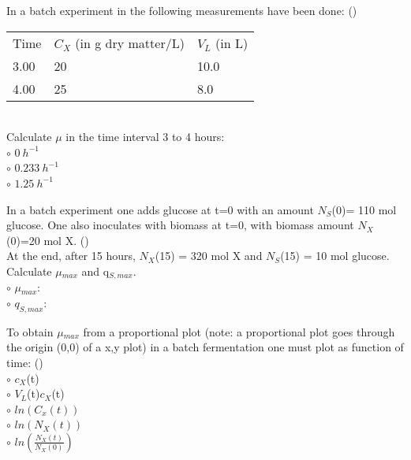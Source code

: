 \documentclass[]{beamer}
\begin{document}
\begin{frame}[shrink] {} 
\color{blue}
  In a batch experiment in the following measurements have been done:
 ({\color{red}{Q8}})\\
\color{gray}
\begin{tabular}[ ]{l l l}
Time & $C_{X}$ (in g dry matter/L) & $V_{L}$ (in L)  \\
3.00 & 20 & 10.0  \\
4.00 & 25 & 8.0  \\
\end{tabular}  \\
\color{blue}
  Calculate $\mu$ in the time interval 3 to 4 hours:
  \\
\color{black}
\setlength{\parindent}{-0.4cm}
{\color{red}$\circ$} $0 ~h^{-1}$  \\
{\color{red}$\circ$} $0.233 ~h^{-1}$  \\
{\color{red}$\circ$} $1.25 ~h^{-1}$  \\
\end{frame}


\begin{frame}[shrink] {} 
\color{blue}
In a batch experiment one adds glucose at t=0 with an amount $N_{S}$(0)= 110 mol glucose. One also inoculates with biomass at t=0, with biomass amount $N_{X}$(0)=20 mol X. ({\color{red}{Q9}})\\
At the end, after 15 hours, $N_{X}$(15) = 320 mol X and $N_{S}$(15) = 10 mol glucose.  \\
Calculate $\mu$$_{max}$ and q$_{S,max}$.  \\[.5em]
\color{black}
\setlength{\parindent}{-0.4cm}
{\color{red}$\circ$} $\mu$$_{max}$:\quad  \\
{\color{red}$\circ$} $q_{S,max}$:\quad \\
\end{frame}


\begin{frame}[shrink] {} 
\color{blue}
To obtain $\mu$$_{max}$ from a proportional plot (note: a proportional plot goes through the origin (0,0) of a x,y plot) in a batch fermentation one must plot as function of time: ({\color{red}{Q10}})\\[0.5em]
\color{black}
\setlength{\parindent}{-0.4cm}
{\color{red}$\circ$} $c_{X}$(t)  \\[0.3em]
{\color{red}$\circ$} $V_{L}$(t)$c_{X}$(t)  \\[0.3em]
{\color{red}$\circ$} $ln(C_x(t))$  \\[0.3em]
{\color{red}$\circ$} $ln(N_X(t))$  \\[0.3em]
{\color{red}$\circ$} $ln(\frac{N_X(t)}{N_X(0)})$  \\[0.3em]
\end{frame}
\end{document}
